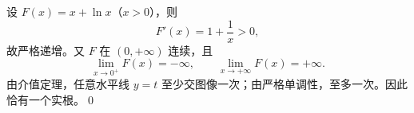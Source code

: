 设 $F(x)=x+\ln x$（$x>0$），则
\[
F'(x)=1+\frac1x>0,
\]
故严格递增。又 $F$ 在 $(0,+\infty)$ 连续，且
\[
\lim_{x\to0^+}F(x)=-\infty,\qquad\lim_{x\to+\infty}F(x)=+\infty.
\]
由介值定理，任意水平线 $y=t$ 至少交图像一次；由严格单调性，至多一次。因此 $\boxed{\text{恰有一个实根}}$。\qed
